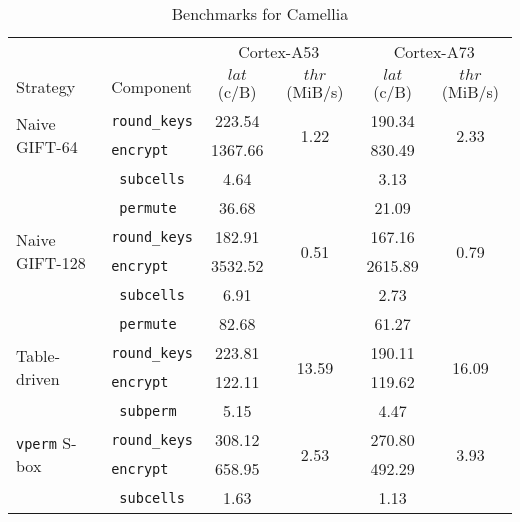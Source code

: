 \begin{table}[h!]
    \centering
    \small
    \caption{Benchmarks for Camellia}
    \begin{tabular}{llcccc}
        \toprule
        & & \multicolumn{2}{c}{Cortex-A53} & \multicolumn{2}{c}{Cortex-A73} \\
        \cmidrule(lr){3-4}\cmidrule(lr){5-6}
        Strategy & Component & $lat$ (c/B) & $thr$ (MiB/s) & $lat$ (c/B) & $thr$ (MiB/s) \\
        \midrule
        \multirow{2}{*}{Naive GIFT-64} & \texttt{round\_keys} & 223.54 & \multirow{2}{*}{1.22} & 190.34 & \multirow{2}{*}{2.33} \\
                                                & \texttt{encrypt} & 1367.66 & &  830.49 & \\
        \cmidrule(lr){2-2}
                                                & \texttt{ subcells} & 4.64 & & 3.13 & \\
                                                & \texttt{  permute} & 36.68 & & 21.09 & \\
        \midrule
        \multirow{2}{*}{Naive GIFT-128} & \texttt{round\_keys} & 182.91 & \multirow{2}{*}{0.51} & 167.16 & \multirow{2}{*}{0.79} \\
                                                 & \texttt{encrypt} & 3532.52 & & 2615.89 & \\
        \cmidrule(lr){2-2}
                                                 & \texttt{ subcells} & 6.91 & & 2.73 & \\
                                                 & \texttt{ permute} & 82.68 & & 61.27 & \\
        \midrule
        \multirow{2}{*}{Table-driven} & \texttt{round\_keys} & 223.81 & \multirow{2}{*}{13.59} & 190.11 & \multirow{2}{*}{16.09} \\
                                      & \texttt{encrypt} & 122.11 & & 119.62 & \\
        \cmidrule(lr){2-2}
                                      & \texttt{ subperm} & 5.15 & & 4.47 & \\
        \midrule
        \multirow{2}{*}{\texttt{vperm} S-box} & \texttt{round\_keys} & 308.12 & \multirow{2}{*}{2.53} & 270.80 & \multirow{2}{*}{3.93} \\
                                              & \texttt{encrypt} & 658.95 & & 492.29 & \\
        \cmidrule(lr){2-2}
                                              & \texttt{ subcells} & 1.63 & & 1.13 & \\

\end{tabular}
\end{table}
